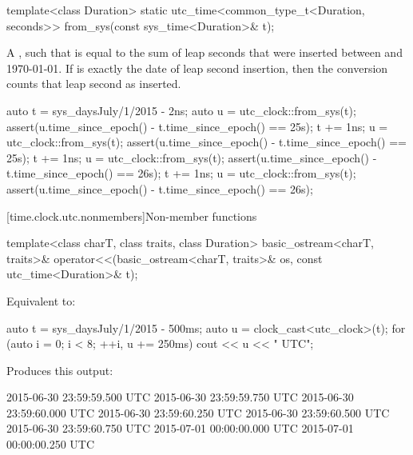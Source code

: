 %
\begin{itemdecl}
template<class Duration>
  static utc_time<common_type_t<Duration, seconds>>
    from_sys(const sys_time<Duration>& t);
\end{itemdecl}

\begin{itemdescr}
\pnum
\returns
A  , such that
is equal to the sum of leap seconds that were inserted
between  and 1970-01-01.
If  is exactly the date of leap second insertion,
then the conversion counts that leap second as inserted.

\begin{example}
\begin{codeblock}
auto t = sys_days{July/1/2015} - 2ns;
auto u = utc_clock::from_sys(t);
assert(u.time_since_epoch() - t.time_since_epoch() == 25s);
t += 1ns;
u = utc_clock::from_sys(t);
assert(u.time_since_epoch() - t.time_since_epoch() == 25s);
t += 1ns;
u = utc_clock::from_sys(t);
assert(u.time_since_epoch() - t.time_since_epoch() == 26s);
t += 1ns;
u = utc_clock::from_sys(t);
assert(u.time_since_epoch() - t.time_since_epoch() == 26s);
\end{codeblock}
\end{example}
\end{itemdescr}

[time.clock.utc.nonmembers]{Non-member functions}

%
\begin{itemdecl}
template<class charT, class traits, class Duration>
  basic_ostream<charT, traits>&
    operator<<(basic_ostream<charT, traits>& os, const utc_time<Duration>& t);
\end{itemdecl}

\begin{itemdescr}
\pnum
\effects
Equivalent to:

\pnum
\begin{example}
\begin{codeblock}
auto t = sys_days{July/1/2015} - 500ms;
auto u = clock_cast<utc_clock>(t);
for (auto i = 0; i < 8; ++i, u += 250ms)
  cout << u << " UTC\n";
\end{codeblock}

Produces this output:

\begin{outputblock}
2015-06-30 23:59:59.500 UTC
2015-06-30 23:59:59.750 UTC
2015-06-30 23:59:60.000 UTC
2015-06-30 23:59:60.250 UTC
2015-06-30 23:59:60.500 UTC
2015-06-30 23:59:60.750 UTC
2015-07-01 00:00:00.000 UTC
2015-07-01 00:00:00.250 UTC
\end{outputblock}
\end{example}
\end{itemdescr}

